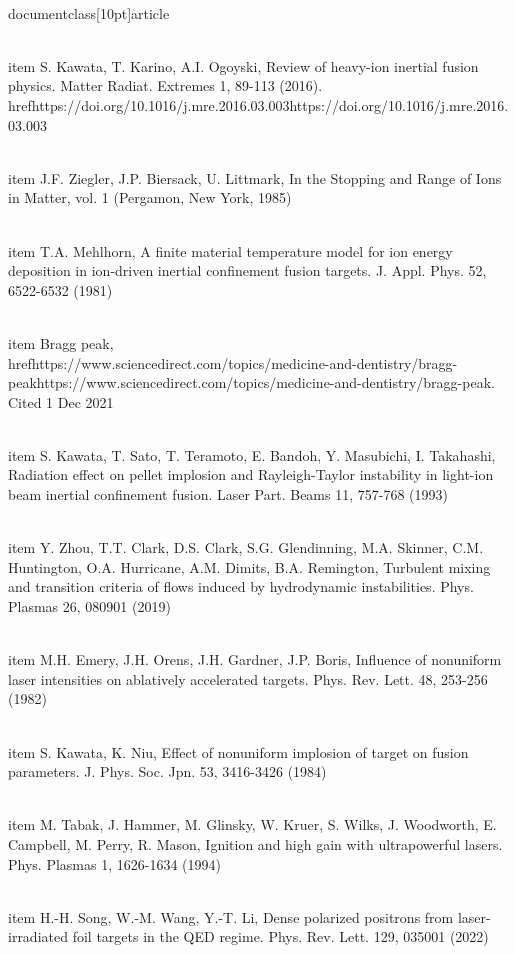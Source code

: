 \\documentclass[10pt]{article}
\begin{document}
{{{{{{  \\item S. Kawata, T. Karino, A.I. Ogoyski, Review of heavy-ion inertial fusion physics. Matter Radiat. Extremes 1, 89-113 (2016). \\href{https://doi.org/10.1016/j.mre.2016.03.003}{https://doi.org/10.1016/j.mre.2016.03.003}

  \\item J.F. Ziegler, J.P. Biersack, U. Littmark, In the Stopping and Range of Ions in Matter, vol. 1 (Pergamon, New York, 1985)

  \\item T.A. Mehlhorn, A finite material temperature model for ion energy deposition in ion-driven inertial confinement fusion targets. J. Appl. Phys. 52, 6522-6532 (1981)

  \\item Bragg peak, \\href{https://www.sciencedirect.com/topics/medicine-and-dentistry/bragg-peak}{https://www.sciencedirect.com/topics/medicine-and-dentistry/bragg-peak}. Cited 1 Dec 2021

  \\item S. Kawata, T. Sato, T. Teramoto, E. Bandoh, Y. Masubichi, I. Takahashi, Radiation effect on pellet implosion and Rayleigh-Taylor instability in light-ion beam inertial confinement fusion. Laser Part. Beams 11, 757-768 (1993)

  \\item Y. Zhou, T.T. Clark, D.S. Clark, S.G. Glendinning, M.A. Skinner, C.M. Huntington, O.A. Hurricane, A.M. Dimits, B.A. Remington, Turbulent mixing and transition criteria of flows induced by hydrodynamic instabilities. Phys. Plasmas 26, 080901 (2019)

  \\item M.H. Emery, J.H. Orens, J.H. Gardner, J.P. Boris, Influence of nonuniform laser intensities on ablatively accelerated targets. Phys. Rev. Lett. 48, 253-256 (1982)

  \\item S. Kawata, K. Niu, Effect of nonuniform implosion of target on fusion parameters. J. Phys. Soc. Jpn. 53, 3416-3426 (1984)

  \\item M. Tabak, J. Hammer, M. Glinsky, W. Kruer, S. Wilks, J. Woodworth, E. Campbell, M. Perry, R. Mason, Ignition and high gain with ultrapowerful lasers. Phys. Plasmas 1, 1626-1634 (1994)

  \\item H.-H. Song, W.-M. Wang, Y.-T. Li, Dense polarized positrons from laser-irradiated foil targets in the QED regime. Phys. Rev. Lett. 129, 035001 (2022)

}}}}}}
\end{document}
